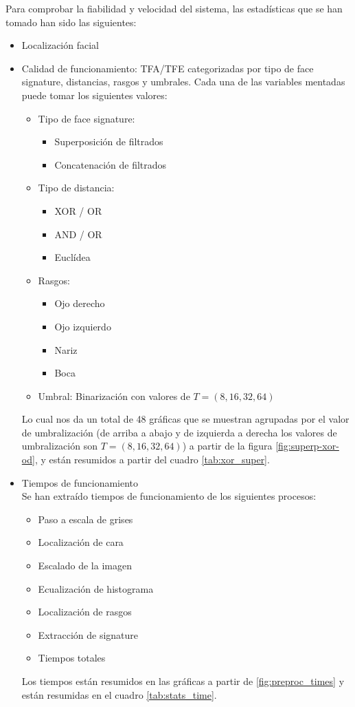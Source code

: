 Para comprobar la fiabilidad y velocidad del sistema, las estadísticas que se han tomado han sido las siguientes:
\begin{itemize}
	\item{Localización facial}
	\item{Calidad de funcionamiento: TFA/TFE categorizadas por tipo de face signature, distancias, rasgos y umbrales. Cada una de las variables mentadas puede tomar los siguientes valores:
		\begin{itemize}
			\item{Tipo de face signature: 
				\begin{itemize}
					\item{Superposición de filtrados}
					\item{Concatenación de filtrados}
				\end{itemize}}
			\item{Tipo de distancia: 
				\begin{itemize}
					\item{XOR / OR}
					\item{AND / OR}
					\item{Euclídea}
				\end{itemize}}
			\item{Rasgos: 
				\begin{itemize}
					\item{Ojo derecho}
					\item{Ojo izquierdo}
					\item{Nariz}
					\item{Boca}
				\end{itemize}}
			\item{Umbral: Binarización con valores de $T=(8,16,32,64)$}
		\end{itemize}

	Lo cual nos da un total de 48 gráficas que se muestran agrupadas por el valor de umbralización (de arriba a abajo y de izquierda a derecha los valores de umbralización son $T=(8,16,32,64)$) a partir de la figura \ref{fig:superp-xor-od}, y están resumidos a partir del cuadro \ref{tab:xor_super}.
	}
	\item{Tiempos de funcionamiento\\
		Se han extraído tiempos de funcionamiento de los siguientes procesos:
		\begin{itemize}
			\item{Paso a escala de grises}
			\item{Localización de cara}
			\item{Escalado de la imagen}
			\item{Ecualización de histograma}
			\item{Localización de rasgos}
			\item{Extracción de signature}
			\item{Tiempos totales}
		\end{itemize}
		Los tiempos están resumidos en las gráficas a partir de \ref{fig:preproc_times} y están resumidas en el cuadro \ref{tab:stats_time}.
	}

\end{itemize}

